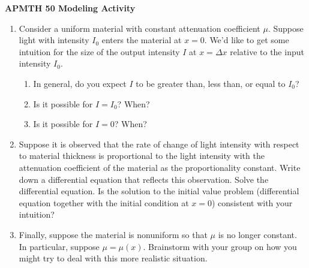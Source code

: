 \documentclass[12pt]{article}
\begin{document}
\begin{center}{\Large \bf{APMTH 50 Modeling Activity}}\\
\end{center}



\begin{enumerate}
\item Consider a uniform material with constant attenuation coefficient $\mu$.  Suppose light with intensity $I_0$ enters the material at $x = 0$.  We'd like to get some intuition for the size of the output intensity $I$ at $x = \Delta x$ relative to the input intensity $I_0$.
\begin{enumerate}
\item  In general, do you expect $I$ to be greater than, less than, or equal to $I_0$? 
\vspace{1in}
\item  Is it possible for $I = I_0$?  When?
\vspace{1in}
\item Is it possible for $I = 0$?  When?
\vspace{1in}
\end{enumerate}
\item Suppose it is observed that the rate of change of light intensity with respect to material thickness is proportional to the light intensity with the attenuation coefficient of the material as the proportionality constant.  Write down a differential equation that reflects this observation.  Solve the differential equation.  Is the solution to the initial value problem (differential equation together with the initial condition at $x= 0$) consistent with your intuition?
\vspace{1in}
\item Finally, suppose the material is nonuniform so that $\mu$ is no longer constant.  In particular, suppose $\mu = \mu(x)$.  Brainstorm with your group on how you might try to deal with this more realistic situation.
\end{enumerate}
\end{document}
